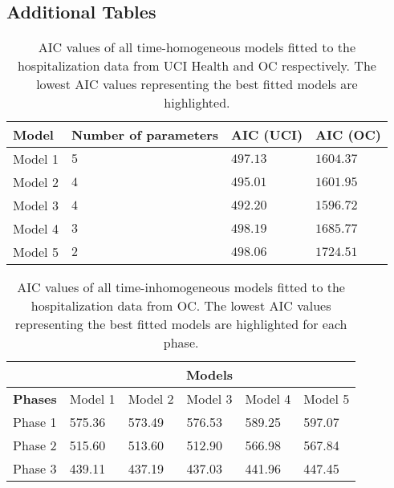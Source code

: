 \documentclass{article}
\begin{document}
\begin{appendices}
\section{Additional Tables}
\setcounter{table}{0}
\renewcommand{\thetable}{\Alph{section}\arabic{table}}
\label{Appendix_4}

\begin{table}[h]
\centering
\begin{tabular}{llll}
\textbf{Model} & \textbf{Number of parameters} & \textbf{AIC (UCI)} & \textbf{AIC (OC)} \\ \hline
Model 1 & $5$ & $497.13$ & $1604.37$ \\ \hline
Model 2 & $4$ & $495.01$ & $1601.95$\\ \hline
Model 3 & $4$ & \cellcolor{blue!25}$492.20$ & \cellcolor{blue!25}$1596.72$\\ \hline
Model 4 & $3$ & $498.19$ & $1685.77$\\ \hline
Model 5 & $2$ & $498.06$ & $1724.51$\\ \hline
\end{tabular}
\vspace{2mm}
\caption{AIC values of all time-homogeneous models fitted to the hospitalization data from UCI Health and OC respectively. The lowest AIC values representing the best fitted models are highlighted.}
\label{A1}
\end{table}

\begin{table}[h]
\centering
\begin{tabular}{llllll}
\centering
 & \multicolumn{5}{c}{\textbf{Models}} \\ \hline
\textbf{Phases} & Model 1 & Model 2 & Model 3 & Model 4 & Model 5\\ \hline
Phase 1 & 575.36 & \cellcolor{blue!25}573.49 & 576.53 & 589.25 & 597.07\\ 
Phase 2 & 515.60 & 513.60 & \cellcolor{blue!25}512.90 & 566.98 & 567.84\\ 
Phase 3 & 439.11 & 437.19 & \cellcolor{blue!25}437.03 & 441.96 & 447.45\\
\hline
\end{tabular}
\vspace{2mm}
\caption{AIC values of all time-inhomogeneous models fitted to the hospitalization data from OC. The lowest AIC values representing the best fitted models are highlighted for each phase.}
\label{A3}
\end{table}


\end{appendices}
\end{document}
